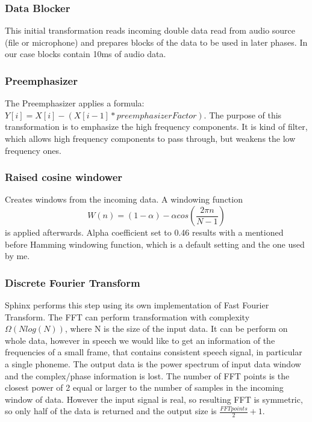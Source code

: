 \documentclass[12pt,a4paper,english]{article}
\begin{document}
\newpage

\subsubsection{Data Blocker}

This initial transformation reads incoming double data read from audio source (file or microphone) and
prepares blocks of the data to be used in later phases. In our case blocks contain 10ms of audio data.

\subsubsection{Preemphasizer}

The Preemphasizer applies a formula: $Y[i]=X[i]-(X[i-1] * preemphasizerFactor)$.
The purpose of this transformation is to emphasize the high frequency components. It is kind of filter,
which allows high frequency components to pass through, but weakens the low frequency ones.


\subsubsection{Raised cosine windower}

Creates windows from the incoming data. A windowing function
\begin{equation}
    W(n)=(1-\alpha) - \alpha cos(\frac{2 \pi n}{N - 1})
\end{equation}
 is applied afterwards. Alpha coefficient set to 0.46 results with a mentioned before Hamming windowing
 function, which is a default setting and the one used by me.

\subsubsection{Discrete Fourier Transform}

Sphinx performs this step using its own implementation of Fast Fourier Transform.
The FFT can perform transformation with complexity $\Omega(Nlog(N))$, where N is the size of the input data.
It can be perform on whole data, however in speech we would like to get an information of the frequencies 
of a small frame, that contains consistent speech signal, in particular a single phoneme.
The output data is the power spectrum of input data window and the complex/phase information is lost.
The number of FFT points is the closest power of 2 equal or larger to the number of samples in the incoming window of data. However the input signal is real, so resulting FFT is symmetric, so only half of the data is returned and the output size is $\frac{FFT points}{2} + 1$.
\end{document}
